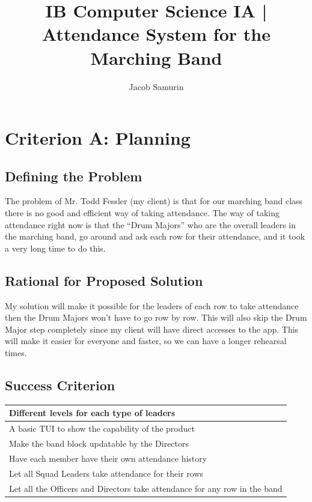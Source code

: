 \documentclass{article}
\title{IB Computer Science IA | Attendance System for the Marching Band}
\author{Jacob Samurin}
\begin{document}
\maketitle
\newpage
\tableofcontents
\newpage
\section{Criterion A: Planning}
\subsection{Defining the Problem}
The problem of Mr. Todd Fessler (my client) is that for our marching band class there is no good and efficient way of taking attendance. The way of taking attendance right now is that the “Drum Majors” who are the overall leaders in the marching band, go around and ask each row for their attendance, and it took a very long time to do this.
\subsection{Rational for Proposed Solution}
My solution will make it possible for the leaders of each row to take attendance then the Drum Majors won’t have to go row by row. This will also skip the Drum Major step completely since my client will have direct accesses to the app. This will make it easier for everyone and faster, so we can have a longer rehearsal times.
\subsection{Success Criterion}
\begin{center}
	\begin{tabular}{|l|}
		\hline
		 Different levels for each type of leaders\\
		\hline
		A basic TUI to show the capability of the product\\
		\hline
		Make the band block updatable by the Directors\\
		\hline
		Have each member have their own attendance history\\
		\hline
		Let all Squad Leaders take attendance for their rows\\
		\hline
		Let all the Officers and Directors take attendance for any row in the band\\
		\hline
	\end{tabular}
\end{center}
\newpage
\end{document}
